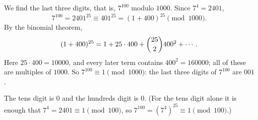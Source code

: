 We find the last three digits, that is, $7^{100}$ modulo $1000$. Since $7^4=2401$,
\[7^{100}=2401^{25}\equiv401^{25}=(1+400)^{25}\pmod{1000}.\]
By the binomial theorem,
\[(1+400)^{25}=1+25\cdot400+\dbinom{25}{2}400^2+\cdots.\]
Here $25\cdot400=10000$, and every later term contains $400^2=160000$; all of these are multiples of $1000$. So $7^{100}\equiv1\pmod{1000}$: the last three digits of $7^{100}$ are $001$.

The tens digit is $\boxed{0}$ and the hundreds digit is $\boxed{0}$. (For the tens digit alone it is enough that $7^4=2401\equiv1\pmod{100}$, so $7^{100}=\left(7^4\right)^{25}\equiv1\pmod{100}$.)
